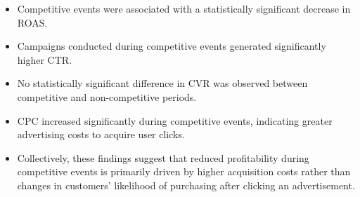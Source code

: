 \begin{itemize}
	
	\item Competitive events were associated with a statistically significant decrease in ROAS.
	
	\item Campaigns conducted during competitive events generated significantly higher CTR.
	
	\item No statistically significant difference in CVR was observed between competitive and non-competitive periods.
	
	\item CPC increased significantly during competitive events, indicating greater advertising costs to acquire user clicks.
	
	\item Collectively, these findings suggest that reduced profitability during competitive events is primarily driven by higher acquisition costs rather than changes in customers' likelihood of purchasing after clicking an advertisement.
	
\end{itemize}